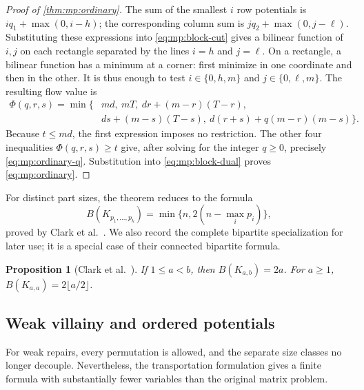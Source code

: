 \documentclass[10pt,a4paper]{amsart}
\numberwithin{equation}{section}
\newtheorem{proposition}[theorem]{Proposition}
\theoremstyle{definition}
\theoremstyle{remark}
\begin{document}
\begin{proof}[Proof of \cref{thm:mp:ordinary}]
The sum of the smallest $i$ row potentials is
$iq_1+\max(0,i-h)$; the corresponding column sum is
$jq_2+\max(0,j-\ell)$. Substituting these expressions into
\eqref{eq:mp:block-cut} gives a bilinear function of $i,j$ on each
rectangle separated by the lines $i=h$ and $j=\ell$. On a rectangle,
a bilinear function has a minimum at a corner: first minimize in one
coordinate and then in the other. It is thus enough to test
$i\in\{0,h,m\}$ and $j\in\{0,\ell,m\}$. The resulting flow value is
\begin{equation}\label{eq:mp:balanced-flow}
\begin{split}
 \Phi(q,r,s)=\min\{&md,\ mT,\ dr+(m-r)(T-r),\\
                  &ds+(m-s)(T-s),\ d(r+s)+q(m-r)(m-s)\}.
\end{split}
\end{equation}
Because $t\le md$, the first expression imposes no restriction. The
other four inequalities $\Phi(q,r,s)\ge t$ give, after solving for the
integer $q\ge0$, precisely \eqref{eq:mp:ordinary-q}. Substitution into
\eqref{eq:mp:block-dual} proves \eqref{eq:mp:ordinary}.
\end{proof}


For distinct part sizes, the theorem reduces to the formula
\[
 B(K_{p_1,\ldots,p_k})=\min\{n,2(n-\max_i p_i)\},
\]
proved by Clark et al.~\cite[Proposition~4.1]{clark2006}. We also record
the complete bipartite specialization for later use; it is a special
case of their connected bipartite formula.

\begin{proposition}[Clark et al.~\cite{clark2006}]
\label{cor:mp:bipartite}
If $1\le a<b$, then $B(K_{a,b})=2a$. For $a\ge1$,
$B(K_{a,a})=2\lfloor a/2\rfloor$.
\end{proposition}

\subsection{Weak villainy and ordered potentials}

For weak repairs, every permutation is allowed, and the separate size
classes no longer decouple. Nevertheless, the transportation formulation
gives a finite formula with substantially fewer variables than the
original matrix problem.
\end{document}
